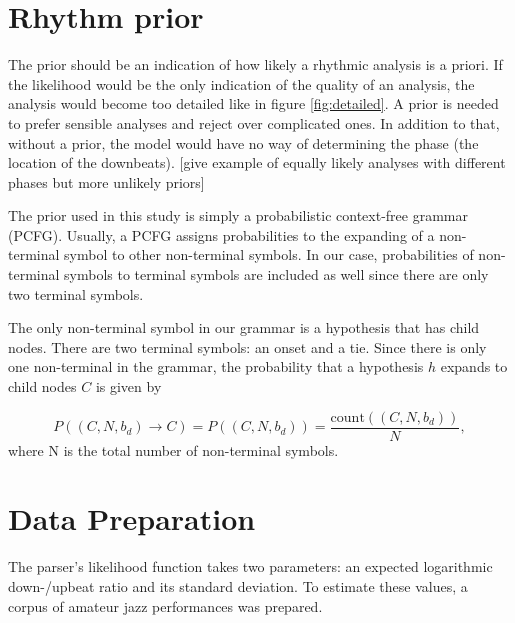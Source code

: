 
\section{Rhythm prior}

The prior should be an indication of how likely a rhythmic analysis is a priori. If the likelihood would be the only indication of the quality of an analysis, the analysis would become too detailed like in figure \ref{fig:detailed}. A prior is needed to prefer sensible analyses and reject over complicated ones. In addition to that, without a prior, the model would have no way of determining the phase (the location of the downbeats). [give example of equally likely analyses with different phases but more unlikely priors]

The prior used in this study is simply a probabilistic context-free grammar (PCFG). Usually, a PCFG assigns probabilities to the expanding of a non-terminal symbol to other non-terminal symbols. In our case, probabilities of non-terminal symbols to terminal symbols are included as well since there are only two terminal symbols.

The only non-terminal symbol in our grammar is a hypothesis that has child nodes. There are two terminal symbols: an onset and a tie. Since there is only one non-terminal in the grammar, the probability that a hypothesis $h$ expands to child nodes $C$ is given by

\begin{equation}
P((C, N, b_d) \rightarrow C) = P((C, N, b_d)) = \frac{\mathrm{count}((C, N, b_d))}{N},
\end{equation}
where N is the total number of non-terminal symbols.

\section{Data Preparation}

The parser's likelihood function takes two parameters: an expected logarithmic down-/upbeat ratio and its standard deviation. To estimate these values, a corpus of amateur jazz performances was prepared.

